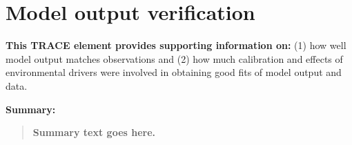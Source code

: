 \documentclass{article}[12pt]
\begin{document}
%
%
%


\section{Model output verification}

\textbf{This TRACE element provides supporting information on:} (1) how well model output matches observations and (2) how much calibration and effects of environmental drivers were involved in obtaining good fits of model output and data. 

\textbf{Summary:}
\begin{verse}
\textbf{
Summary text goes here.
}
\end{verse}

\end{document}
